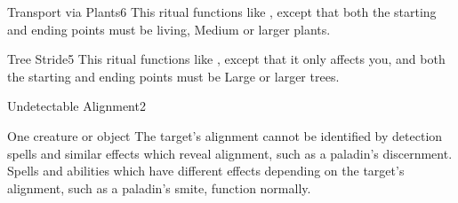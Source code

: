 \begin{spellsection}{Transport via Plants}{6}
\spellline
\spelleffect This ritual functions like , except that both the starting and ending points must be living, Medium or larger plants.
\end{spellsection}

\begin{spellsection}{Tree Stride}{5}
\spellspecial This ritual functions like , except that it only affects you, and both the starting and ending points must be Large or larger trees.
\end{spellsection}

\begin{spellsection}{Undetectable Alignment}{2}
\spellrng{\rngclose}
\spelldur \durext \dismissable
\begin{spelltarget}{One creature or object}
    \spelleffect The target's alignment cannot be identified by detection spells and similar effects which reveal alignment, such as a paladin's discernment. Spells and abilities which have different effects depending on the target's alignment, such as a paladin's smite, function normally.
\end{spelltarget}
\end{spellsection}

